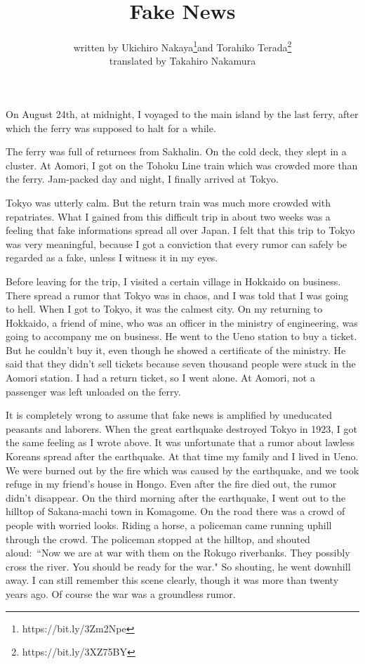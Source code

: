 \documentclass[11pt,a4j,twocolumn]{jarticle}
\title{Fake News}
\author{written by
Ukichiro Nakaya\thanks{https://bit.ly/3Zm2Npe}and
Torahiko Terada\thanks{https://bit.ly/3XZ75BY}\\
translated by Takahiro Nakamura
}
\date{}
\makeatletter
\def\section{\@startsection {section}{1}{\z@}{-2ex}{2ex}{\bf}}
\makeatother
\begin{document}
\maketitle

\section{Ukichiro Nakaya wrote in 1945:}

On August 24th, at midnight, I voyaged to the main island by the last ferry,
after which the ferry was supposed to halt for a while.

The ferry was full of returnees from Sakhalin.
On the cold deck, they slept in a cluster.
At Aomori, I got on the Tohoku Line train which was crowded more than the ferry.
Jam-packed day and night, I finally arrived at Tokyo.

Tokyo was utterly calm.
But the return train was much more crowded with repatriates.
What I gained from this difficult trip in about two weeks
was a feeling that fake informations spread all over Japan.
I felt that this trip to Tokyo was very meaningful,
because I got a conviction that every rumor can safely be
regarded as a fake, unless I witness it in my eyes.

Before leaving for the trip, I visited a certain village in Hokkaido on business.
There spread a rumor that Tokyo was in chaos, and I was told that I was going to hell.
When I got to Tokyo, it was the calmest city.
On my returning to Hokkaido, a friend of mine, who was an officer in the ministry of engineering,
was going to accompany me on business. 
He went to the Ueno station to buy a ticket.
But he couldn't buy it, even though he showed a certificate of the ministry.
He said that they didn't sell tickets because
seven thousand people were stuck in the Aomori station.
I had a return ticket, so I went alone.
At Aomori, not a passenger was left unloaded on the ferry.

It is completely wrong to assume that
fake news is amplified by uneducated peasants and laborers.
When the great earthquake destroyed Tokyo in 1923, 
I got the same feeling as I wrote above.
It was unfortunate that a rumor about lawless Koreans spread after the earthquake.
At that time my family and I lived in Ueno.
We were burned out by the fire which was caused by the earthquake,
and we took refuge in my friend's house in Hongo.
Even after the fire died out, the rumor didn't disappear.
On the third morning after the earthquake, I went out to the hilltop of Sakana-machi town in Komagome.
On the road there was a crowd of people with worried looks.
Riding a horse, a policeman came running uphill through the crowd.
The policeman stopped at the hilltop, and shouted aloud:\
``Now we are at war with them on the Rokugo riverbanks.
They possibly cross the river. You should be ready for the war."
So shouting, he went downhill away.
I can still remember this scene clearly, though it was more than twenty years ago.
Of course the war was a groundless rumor.
\end{document}
